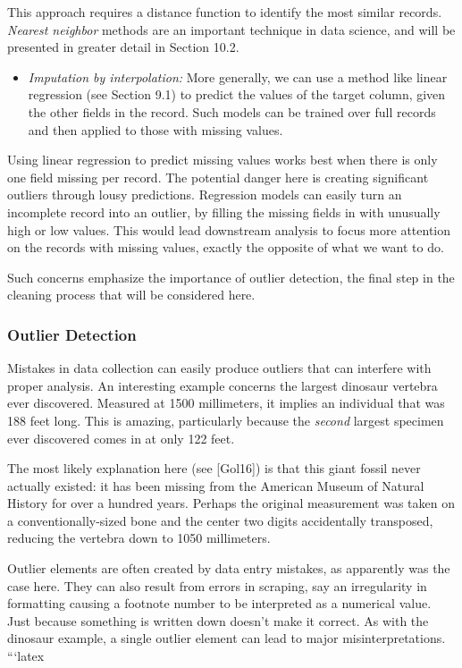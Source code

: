 \documentclass[10pt]{article}
\begin{document}
This approach requires a distance function to identify the most similar records. \emph{Nearest neighbor} methods are an important technique in data science, and will be presented in greater detail in Section 10.2.

\begin{itemize}
  \item \emph{Imputation by interpolation:} More generally, we can use a method like linear regression (see Section 9.1) to predict the values of the target column, given the other fields in the record. Such models can be trained over full records and then applied to those with missing values.
\end{itemize}

Using linear regression to predict missing values works best when there is only one field missing per record. The potential danger here is creating significant outliers through lousy predictions. Regression models can easily turn an incomplete record into an outlier, by filling the missing fields in with unusually high or low values. This would lead downstream analysis to focus more attention on the records with missing values, exactly the opposite of what we want to do.

Such concerns emphasize the importance of outlier detection, the final step in the cleaning process that will be considered here.

\subsubsection{Outlier Detection}
Mistakes in data collection can easily produce outliers that can interfere with proper analysis. An interesting example concerns the largest dinosaur vertebra ever discovered. Measured at 1500 millimeters, it implies an individual that was 188 feet long. This is amazing, particularly because the \emph{second} largest specimen ever discovered comes in at only 122 feet.

The most likely explanation here (see [Gol16]) is that this giant fossil never actually existed: it has been missing from the American Museum of Natural History for over a hundred years. Perhaps the original measurement was taken on a conventionally-sized bone and the center two digits accidentally transposed, reducing the vertebra down to 1050 millimeters.

Outlier elements are often created by data entry mistakes, as apparently was the case here. They can also result from errors in scraping, say an irregularity in formatting causing a footnote number to be interpreted as a numerical value. Just because something is written down doesn't make it correct. As with the dinosaur example, a single outlier element can lead to major misinterpretations.
```latex
\end{document}
